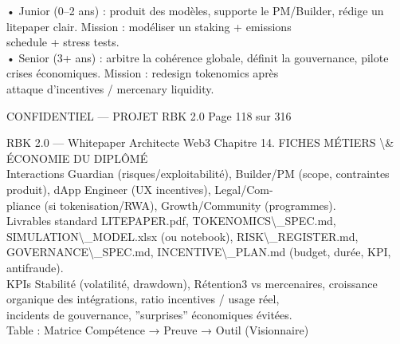 \documentclass[12pt,landscape,a4paper]{article}
\newenvironment{confidential}
{\begin{tcolorbox}[
    colback=rbkred!5!white,
    colframe=rbkred!75!black,
    title=CONFIDENTIEL,
    fonttitle=\bfseries\color{white},
    coltitle=rbkred!75!black,
    breakable,
    enhanced,
    frame hidden,
    borderline west={2pt}{0pt}{rbkred!75!black}
]}
{\end{tcolorbox}}
\begin{document}
\vspace{0.5em}
• Junior (0–2 ans) : produit des modèles, supporte le PM/Builder, rédige un litepaper clair. Mission : modéliser un staking + emissions\\
schedule + stress tests.\\
\vspace{0.5em}
• Senior (3+ ans) : arbitre la cohérence globale, définit la gouvernance, pilote crises économiques. Mission : redesign tokenomics après\\
attaque d’incentives / mercenary liquidity.\\
\vspace{0.5em}
\vspace{0.5em}
\vspace{0.5em}
\vspace{0.5em}
\begin{confidential}CONFIDENTIEL — PROJET RBK 2.0                               Page 118 sur 316\end{confidential}
RBK 2.0 — Whitepaper Architecte Web3                                                              Chapitre 14. FICHES MÉTIERS \textbackslash{}& ÉCONOMIE DU DIPLÔMÉ\\
\vspace{0.5em}
\vspace{0.5em}
Interactions Guardian (risques/exploitabilité), Builder/PM (scope, contraintes produit), dApp Engineer (UX incentives), Legal/Com-\\
pliance (si tokenisation/RWA), Growth/Community (programmes).\\
\vspace{0.5em}
Livrables  standard LITEPAPER.pdf, TOKENOMICS\textbackslash{}_SPEC.md, SIMULATION\textbackslash{}_MODEL.xlsx                                        (ou   notebook),   RISK\textbackslash{}_REGISTER.md,\\
GOVERNANCE\textbackslash{}_SPEC.md, INCENTIVE\textbackslash{}_PLAN.md (budget, durée, KPI, antifraude).\\
\vspace{0.5em}
\vspace{0.5em}
KPIs Stabilité (volatilité, drawdown), Rétention3 vs mercenaires, croissance organique des intégrations, ratio incentives / usage réel,\\
incidents de gouvernance, ”surprises” économiques évitées.\\
\vspace{0.5em}
Table : Matrice Compétence → Preuve → Outil (Visionnaire)\\
\end{document}
